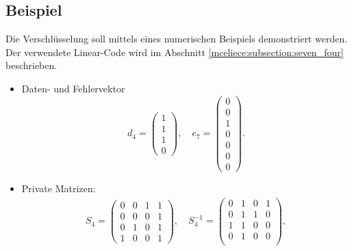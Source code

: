 \subsection{Beispiel}
Die Verschlüsselung soll mittels eines numerischen Beispiels demonstriert werden. 
Der verwendete Linear-Code wird im Abschnitt \ref{mceliece:subsection:seven_four} beschrieben.
\begin{itemize}
    \item Daten- und Fehlervektor
        \[d_4=
        \begin{pmatrix}
            1\\
            1\\
            1\\
            0 
        \end{pmatrix}
        ,\quad
        e_7=
        \begin{pmatrix}
            0\\
            0\\
            1\\
            0\\
            0\\
            0\\
            0
        \end{pmatrix}.
        \]
    \item Private Matrizen:
\begin{gather*}
        S_4=
            \begin{pmatrix}
                0 & 0 & 1 & 1\\
                0 & 0 & 0 & 1\\
                0 & 1 & 0 & 1\\
                1 & 0 & 0 & 1
            \end{pmatrix},\quad
            S_4^{-1}=
            \begin{pmatrix}
                0 & 1 & 0 & 1\\
                0 & 1 & 1 & 0\\
                1 & 1 & 0 & 0\\
                0 & 1 & 0 & 0\\
            \end{pmatrix},
	\\

\end{gather*}
\end{itemize}
